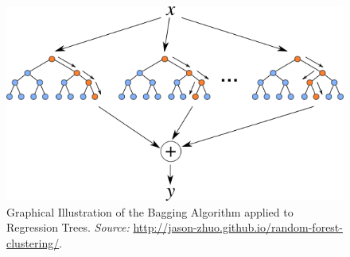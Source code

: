 \begin{figure}[H]
\centering
\includegraphics[scale=0.6]{external_figures/baggedtree.png}
\caption[Graphical Illustration of the Bagging algorithm applied to Regression Trees.]{Graphical Illustration of the Bagging Algorithm applied to Regression Trees. \textit{Source:} \url{http://jason-zhuo.github.io/random-forest-clustering/}.}\label{fig:Ill_Bag}
\end{figure}
